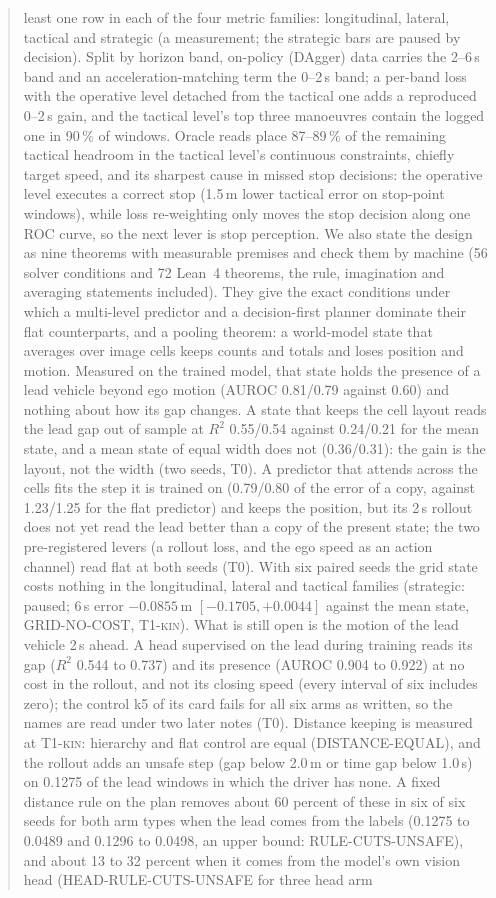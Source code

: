 \documentclass[10pt,twocolumn]{article}
\theoremstyle{remark}
\newcommand{\tier}[1]{\textsc{\small #1}}
\begin{document}
\begin{abstract}
least one row in each of the four metric families: longitudinal, lateral, tactical and strategic (a measurement; the strategic bars are paused by decision). Split by horizon band, on-policy (DAgger) data carries the 2--6\,s band and an acceleration-matching term the 0--2\,s band; a per-band loss with the operative level detached from the tactical one adds a reproduced 0--2\,s gain, and the tactical level's top three manoeuvres contain the logged one in 90\,\% of windows. Oracle reads place 87--89\,\% of the remaining tactical headroom in the tactical level's continuous constraints, chiefly target speed, and its sharpest cause in missed stop decisions: the operative level executes a correct stop (1.5\,m lower tactical error on stop-point windows), while loss re-weighting only moves the stop decision along one ROC curve, so the next lever is stop perception. We also state the design as nine theorems with measurable premises and check them by machine (56 solver conditions and 72 Lean~4 theorems, the rule, imagination and averaging statements included). They give the exact conditions under which a multi-level predictor and a decision-first planner dominate their flat counterparts, and a pooling theorem: a world-model state that averages over image cells keeps counts and totals and loses position and motion. Measured on the trained model, that state holds the presence of a lead vehicle beyond ego motion (AUROC 0.81/0.79 against 0.60) and nothing about how its gap changes. A state that keeps the cell layout reads the lead gap out of sample at $R^2$ 0.55/0.54 against 0.24/0.21 for the mean state, and a mean state of equal width does not (0.36/0.31): the gain is the layout, not the width (two seeds, \tier{T0}). A predictor that attends across the cells fits the step it is trained on (0.79/0.80 of the error of a copy, against 1.23/1.25 for the flat predictor) and keeps the position, but its 2\,s rollout does not yet read the lead better than a copy of the present state; the two pre-registered levers (a rollout loss, and the ego speed as an action channel) read flat at both seeds (\tier{T0}). With six paired seeds the grid state costs nothing in the longitudinal, lateral and tactical families (strategic: paused; 6\,s error $-0.0855$\,m $[-0.1705,+0.0044]$ against the mean state, GRID-NO-COST, \tier{T1-kin}). What is still open is the motion of the lead vehicle 2\,s ahead. A head supervised on the lead during training reads its gap ($R^2$ 0.544 to 0.737) and its presence (AUROC 0.904 to 0.922) at no cost in the rollout, and not its closing speed (every interval of six includes zero); the control k5 of its card fails for all six arms as written, so the names are read under two later notes (\tier{T0}). Distance keeping is measured at \tier{T1-kin}: hierarchy and flat control are equal (DISTANCE-EQUAL), and the rollout adds an unsafe step (gap below 2.0\,m or time gap below 1.0\,s) on 0.1275 of the lead windows in which the driver has none. A fixed distance rule on the plan removes about 60 percent of these in six of six seeds for both arm types when the lead comes from the labels (0.1275 to 0.0489 and 0.1296 to 0.0498, an upper bound: RULE-CUTS-UNSAFE), and about 13 to 32 percent when it comes from the model's own vision head (HEAD-RULE-CUTS-UNSAFE for three head arm 
\end{abstract}
\end{document}

